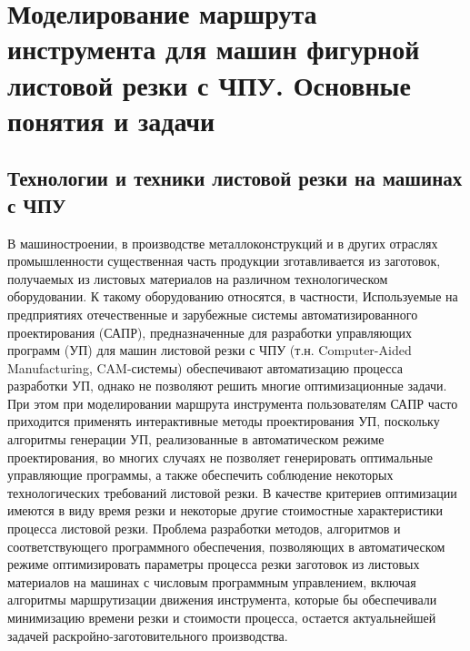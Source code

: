\documentclass{article}
\begin{document}
\section{Моделирование маршрута инструмента для машин фигурной листовой резки с ЧПУ. Основные понятия и задачи}

\subsection{Технологии и техники листовой резки на машинах с ЧПУ}

В машиностроении, в производстве металлоконструкций
и в других отраслях промышленности существенная часть продукции
зготавливается из заготовок,
получаемых из листовых материалов на различном технологическом оборудовании.
К такому оборудованию относятся, в частности,
Используемые на предприятиях отечественные и зарубежные
системы автоматизированного проектирования (САПР),
предназначенные для разработки управляющих программ (УП)
для машин листовой резки с ЧПУ (т.н. Computer-Aided Manufacturing, CAM-системы)
обеспечивают автоматизацию процесса разработки УП,
однако не позволяют решить многие оптимизационные задачи.
При этом при моделировании маршрута инструмента пользователям
САПР часто приходится применять интерактивные методы проектирования УП,
поскольку алгоритмы генерации УП,
реализованные в автоматическом режиме проектирования,
во многих случаях не позволяет генерировать оптимальные управляющие программы,
а также обеспечить соблюдение некоторых технологических требований листовой резки.
В качестве критериев оптимизации имеются в виду время резки и
некоторые другие стоимостные характеристики процесса листовой резки.
Проблема разработки методов, алгоритмов и соответствующего программного обеспечения,
позволяющих в автоматическом режиме оптимизировать параметры
процесса резки заготовок из листовых материалов на машинах с числовым программным управлением,
включая алгоритмы маршрутизации движения инструмента,
которые бы обеспечивали минимизацию времени резки и стоимости процесса,
остается актуальнейшей задачей раскройно-заготовительного производства.
\end{document}
